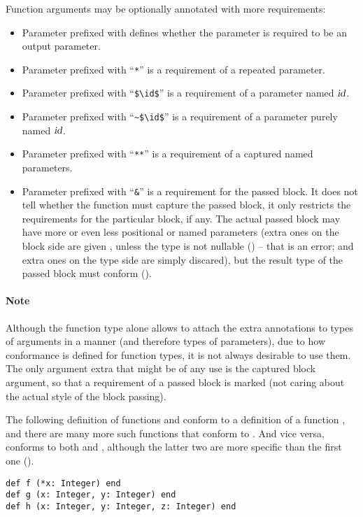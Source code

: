 Function arguments may be optionally annotated with more requirements: 
\begin{itemize}
\item
Parameter prefixed with  defines whether the parameter is required to be an output parameter. 

\item
Parameter prefixed with ``\lstinline!*!'' is a requirement of a repeated parameter. 

\item 
Parameter prefixed with ``\lstinline!$\id$!'' is a requirement of a parameter named $\mbox{\sl id}$.

\item 
Parameter prefixed with ``\lstinline!~$\id$!'' is a requirement of a parameter purely named $\mbox{\sl id}$.

\item 
Parameter prefixed with ``\lstinline!**!'' is a requirement of a captured named parameters. 

\item
Parameter prefixed with ``\lstinline!&!'' is a requirement for the passed block. It does not tell whether the function must capture the passed block, it only restricts the requirements for the particular block, if any. The actual passed block may have more or even less positional or named parameters (extra ones on the block side are given , unless the type is not nullable () -- that is an error; and extra ones on the type side are simply discared), but the result type of the passed block must conform ().
\end{itemize}

\paragraph{Note}
Although the function type alone allows to attach the extra annotations to types of arguments in a  manner (and therefore types of parameters), due to how conformance is defined for function types, it is not always desirable to use them. The only argument extra that might be of any use is the captured block argument, so that a requirement of a passed block is marked (not caring about the actual style of the block passing). 

\example The following definition of functions  and  conform to a definition of a function , and there are many more such functions that conform to . And vice versa,  conforms to both  and , although the latter two are more specific than the first one (). 
\begin{lstlisting}
def f (*x: Integer) end
def g (x: Integer, y: Integer) end
def h (x: Integer, y: Integer, z: Integer) end
\end{lstlisting}







